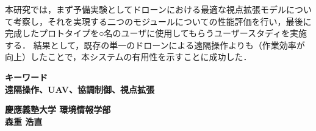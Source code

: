 本研究では，まず予備実験としてドローンにおける最適な視点拡張モデルについて考察し，それを実現する二つのモジュールについての性能評価を行い，最後に完成したプロトタイプを○名のユーザに使用してもらうユーザースタディを実施する．
結果として，既存の単一のドローンによる遠隔操作よりも（作業効率が向上）したことで，本システムの有用性を示すことに成功した．









\begin{flushleft}
\textbf{キーワード}\\
\textbf{遠隔操作、UAV、協調制御、視点拡張}

\end{flushleft}

\begin{flushright}
\textbf{慶應義塾大学 環境情報学部}\\
\textbf{森重 浩直}
\end{flushright}
\newpage

